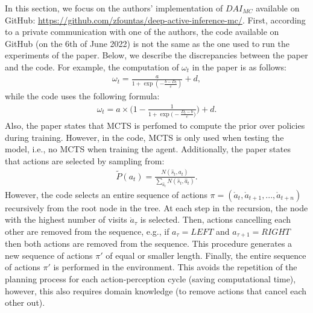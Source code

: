 \documentclass[twoside,11pt]{article}
\begin{document}
In this section, we focus on the authors' implementation of $DAI_{MC}$ available on GitHub: \url{https://github.com/zfountas/deep-active-inference-mc/}. First, according to a private communication with one of the authors, the code available on GitHub (on the 6th of June 2022) is not the same as the one used to run the experiments of the paper. Below, we describe the discrepancies between the paper and the code. For example, the computation of $\omega_t$ in the paper is as follows:
\begin{align*}
\omega_t = \frac{a}{1 + \exp(-\frac{b - D_t}{c})} + d,
\end{align*}
while the code uses the following formula:
\begin{align*}
\omega_t = a\times \Bigg(1 - \frac{1}{1 + \exp\big(-\frac{D_t - b}{c}\big)}\Bigg) + d.
\end{align*}
Also, the paper states that MCTS is perfomed to compute the prior over policies during training. However, in the code, MCTS is only used when testing the model, i.e., no MCTS when training the agent. Additionally, the paper states that actions are selected by sampling from:
\begin{align*}
\tilde{P}(a_t) = \frac{N(\hat{s}_t, a_t)}{\sum_{\hat{a}_t}N(\hat{s}_t, \hat{a}_t)}.
\end{align*}
However, the code selects an entire sequence of actions $\pi = (\mathring{a}_t, \mathring{a}_{t+1}, ..., \mathring{a}_{t+n})$ recursively from the root node in the tree. At each step in the recursion, the node with the highest number of visits $\mathring{a}_\tau$ is selected. Then, actions cancelling each other are removed from the sequence, e.g., if $a_\tau = LEFT$ and $a_{\tau+1} = RIGHT$ then both actions are removed from the sequence. This procedure generates a new sequence of actions $\pi'$ of equal or smaller length. Finally, the entire sequence of actions $\pi'$  is performed in the environment. This avoids the repetition of the planning process for each action-perception cycle (saving computational time), however, this also requires domain knowledge (to remove actions that cancel each other out).
\end{document}
